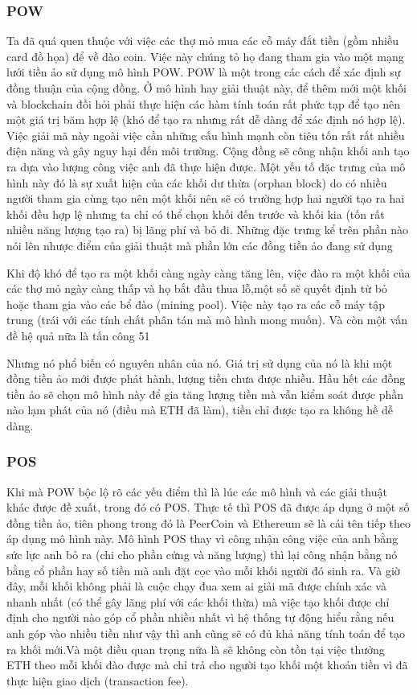 \documentclass[12pt]{article}
\begin{document}
	\subsubsection{POW}
	Ta đã quá quen thuộc với việc các thợ mỏ mua các cỗ máy đắt tiền (gồm nhiều card đồ họa) để về đào coin. Việc này chúng tỏ họ đang tham gia vào một mạng lưới tiền ảo sử dụng mô hình POW. POW là một trong các cách để xác định sự đồng thuận của cộng đồng. Ở mô hình hay giải thuật này, để thêm mới một khối và blockchain đồi hỏi phải thực hiện các hàm tính toán rất phức tạp để tạo nên một giá trị băm hợp lệ (khó để tạo ra nhưng rất dễ dàng để xác định nó hợp lệ). Việc giải mã này ngoài việc cần những cấu hình mạnh còn tiêu tốn rất rất nhiều điện năng và gây nguy hại đến môi trường. Cộng đồng sẽ công nhận khối anh tạo ra dựa vào lượng công việc anh đã thực hiện được. Một yếu tố đặc trưng của mô hình này đó là sự xuất hiện của các khối dư thừa (orphan block) do có nhiều người tham gia cùng tạo nên một khối nên sẽ có trường hợp hai người tạo ra hai khối đều hợp lệ nhưng ta chỉ có thể chọn khối đến trước và khối kia (tốn rất nhiều năng lượng tạo ra) bị lãng phí và bỏ đi. Những đặc trưng kể trên phần nào nói lên nhược điểm của giải thuật mà phần lớn các đồng tiền ảo đang sử dụng

Khi độ khó để tạo ra một khối càng ngày càng tăng lên, việc đào ra một khối của các thợ mỏ ngày càng thấp và họ bắt đầu thua lỗ,một số sẽ quyết định từ bỏ hoặc tham gia vào các bể đào (mining pool). Việc này tạo ra các cỗ máy tập trung (trái với các tính chất phân tán mà mô hình mong muốn). Và còn một vấn đề hệ quả nữa là tấn công 51%

Nhưng nó phổ biến có nguyên nhân của nó. Giá trị sử dụng của nó là khi một đồng tiền ảo mới được phát hành, lượng tiền chưa được nhiều. Hầu hết các đồng tiền ảo sẽ chọn mô hình này để gia tăng lượng tiền mà vẫn kiểm soát được phần nào lạm phát của nó (điều mà ETH đã làm), tiền chỉ được tạo ra không hề dễ dàng.
	\subsubsection{POS}
	Khi mà POW bộc lộ rõ các yếu điểm thì là lúc các mô hình và các giải thuật khác được đề xuất, trong đó có POS. Thực tế thì POS đã được áp dụng ở một số đồng tiền ảo, tiên phong trong đó là PeerCoin và Ethereum sẽ là cái tên tiếp theo áp dụng mô hình này. Mô hình POS thay vì công nhận công việc của anh bằng sức lực anh bỏ ra (chi cho phần cứng và năng lượng) thì lại công nhận bằng nó bằng cổ phần hay số tiền mà anh đặt cọc vào mỗi khối người đó sinh ra. Và giờ đây, mỗi khối không phải là cuộc chạy đua xem ai giải mã được chính xác và nhanh nhất (có thể gây lãng phí với các khối thừa) mà việc tạo khối được chỉ định cho người nào góp cổ phần nhiều nhất vì hệ thống tự động hiểu rằng nếu anh góp vào nhiều tiền như vậy thì anh cũng sẽ có đủ khả năng tính toán để tạo ra khối mới.Và một điều quan trọng nữa là sẽ không còn tồn tại việc thưởng ETH theo mỗi khối đào được mà chỉ trả cho người tạo khối một khoản tiền vì đã thực hiện giao dịch (transaction fee).
\end{document}
